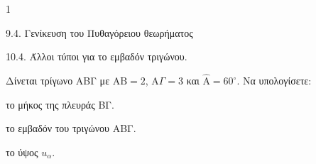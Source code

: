 \begin{ylh}{1}
    \item 9.4. Γενίκευση του Πυθαγόρειου θεωρήματος
    \item 10.4. Άλλοι τύποι για το εμβαδόν τριγώνου.
\end{ylh}
Δίνεται τρίγωνο ΑΒΓ με $\text{AB} = 2$, $\text{A}\Gamma = 3$ και $\widehat{\text{A}} = 60^\circ$. Να υπολογίσετε:
\begin{alist}
\item το μήκος της πλευράς ΒΓ. 
\item το εμβαδόν του τριγώνου ΑΒΓ. 
\item το ύψος $u_\alpha$. 
\end{alist}